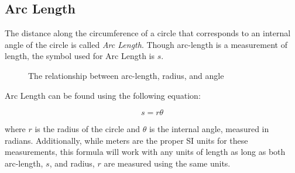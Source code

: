 \newpage
   \subsection{Arc Length} 
   
   The distance along the circumference of a circle that corresponds to an internal angle of the circle is called \textit{Arc Length}.  Though arc-length is a measurement of length, the symbol used for Arc Length is $s$. 
 \begin{figure}[h]
 	  \begin{center}
   \end{center}
 \caption{The relationship between arc-length, radius, and angle}
 \end{figure}
   	
  
   	

   
   
   
   
   
   
   
   
   
    Arc Length can be found using the following equation:
   
   	\begin{mdframed}[backgroundcolor=orange!20!white]
   	
   	\begin{equation}
   		s = r \theta
   		\label{equation:arclength}
   	\end{equation}
   \end{mdframed}
where $r$ is the radius of the circle and $\theta$ is the internal angle, measured in radians. Additionally, while meters are the proper SI units for these measurements, this formula will work with any units of length as long as both arc-length, $s$, and radius, $r$ are measured using the same units.  




